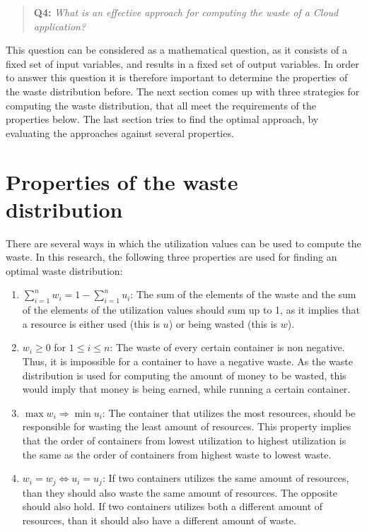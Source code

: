 \begin{quote}
\textbf{Q4: }\textit{What is an effective approach for computing the waste of a Cloud application?}\\
\end{quote}

\noindent
This question can be considered as a mathematical question, as it consists of a fixed set of input variables, and results in a fixed set of output variables. In order to answer this question it is therefore important to determine the properties of the waste distribution before. The next section comes up with three strategies for computing the waste distribution, that all meet the requirements of the properties below. The last section tries to find the optimal approach, by evaluating the approaches against several properties.

\section{Properties of the waste distribution}
There are several ways in which the utilization values can be used to compute the waste. In this research, the following three properties are used for finding an optimal waste distribution:
\begin{enumerate}
    \item \textbf{$\sum_{i=1}^n w_i = 1 - \sum_{i=1}^n u_i $}: The sum of the elements of the waste and the sum of the elements of the utilization values should sum up to 1, as it implies that a resource is either used (this is $u$) or being wasted (this is $w$).
    \item \textbf{$w_i \geq 0$} for $1 \leq i \leq n$: The waste of every certain container is non negative. Thus, it is impossible for a container to have a negative waste. As the waste distribution is used for computing the amount of money to be wasted, this would imply that money is being earned, while running a certain container.
    \item \textbf{$\max w_i \Rightarrow \min u_i$}: The container that utilizes the most resources, should be responsible for wasting the least amount of resources. This property implies that the order of containers from lowest utilization to highest utilization is the same as the order of containers from highest waste to lowest waste. 
    \item \textbf{$w_i = w_j \iff u_i = u_j$}: If two containers utilizes the same amount of resources, than they should also waste the same amount of resources. The opposite should also hold. If two containers utilizes both a different amount of resources, than it should also have a different amount of waste.
\end{enumerate}


